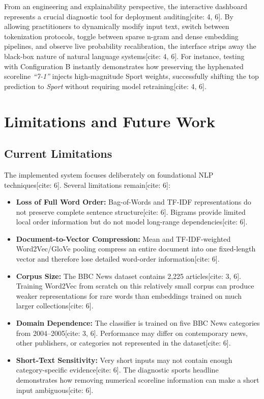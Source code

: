 \documentclass[11pt,a4paper]{article}
\begin{document}
	From an engineering and explainability perspective, the interactive dashboard represents a crucial diagnostic tool for deployment auditing[cite: 4, 6]. By allowing practitioners to dynamically modify input text, switch between tokenization protocols, toggle between sparse n-gram and dense embedding pipelines, and observe live probability recalibration, the interface strips away the black-box nature of natural language systems[cite: 4, 6]. For instance, testing with Configuration B instantly demonstrates how preserving the hyphenated scoreline \textit{``7-1''} injects high-magnitude Sport weights, successfully shifting the top prediction to \textit{Sport} without requiring model retraining[cite: 4, 6].
	
	\section{Limitations and Future Work}
	\label{sec:limitations}
	
	\subsection{Current Limitations}
	The implemented system focuses deliberately on foundational NLP techniques[cite: 6]. Several limitations remain[cite: 6]:
	
	\begin{itemize}[leftmargin=1.5em, itemsep=0.2em]
		\item \textbf{Loss of Full Word Order:} Bag-of-Words and TF-IDF representations do not preserve complete sentence structure[cite: 6]. Bigrams provide limited local order information but do not model long-range dependencies[cite: 6].
		\item \textbf{Document-to-Vector Compression:} Mean and TF-IDF-weighted Word2Vec/GloVe pooling compress an entire document into one fixed-length vector and therefore lose detailed word-order information[cite: 6].
		\item \textbf{Corpus Size:} The BBC News dataset contains 2,225 articles[cite: 3, 6]. Training Word2Vec from scratch on this relatively small corpus can produce weaker representations for rare words than embeddings trained on much larger collections[cite: 6].
		\item \textbf{Domain Dependence:} The classifier is trained on five BBC News categories from 2004--2005[cite: 3, 6]. Performance may differ on contemporary news, other publishers, or categories not represented in the dataset[cite: 6].
		\item \textbf{Short-Text Sensitivity:} Very short inputs may not contain enough category-specific evidence[cite: 6]. The diagnostic sports headline demonstrates how removing numerical scoreline information can make a short input ambiguous[cite: 6].
	\end{itemize}
	
\end{document}
